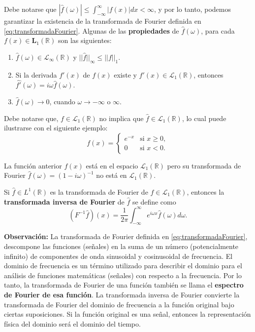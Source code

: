 \begin{multicols}{2}
Debe notarse que $|\hat{f}(\omega)| \leq \int_{-\infty}^{\infty} |f(x)| dx < \infty$, y por lo tanto, podemos garantizar la existencia de la transformada de Fourier definida en \ref{eq:transformadaFourier}. Algunas de las \textbf{propiedades} de $\hat{f}(\omega)$, para cada $f(x) \in \textbf{L}_1(\mathbb{R})$ son las siguientes:
\begin{enumerate}[(1)]
    \item  $\hat{f}(\omega) \in \mathcal{L}_\infty(\mathbb{R})$ y $||\hat{f}||_\infty \leq ||f||_1$.
    \item  Si la derivada $f'(x)$ de $f(x)$ existe y $f'(x) \in \mathcal{L}_1(\mathbb{R})$, entonces $\hat{f'}(\omega) = i\omega \hat{f}(\omega)$.
    \item $\hat{f}(\omega) \rightarrow 0$, cuando $\omega \rightarrow -\infty$ o $\infty$.
\end{enumerate}

Debe notarse que, $f \in \mathcal{L}_1(\mathbb{R})$ no implica que $\hat{f} \in \mathcal{L}_1(\mathbb{R})$, lo cual puede ilustrarse con el siguiente ejemplo:
$$
f(x) = 
\begin{cases} 
e^{-x} & \text{si } x \geq 0, \\
0 & \text{si } x < 0.
\end{cases}
$$

La función anterior $f(x)$ está en el espacio $\mathcal{L}_1(\mathbb{R})$ pero su transformada de Fourier $\hat{f}(\omega) = (1 - i\omega)^{-1}$ no está en $\mathcal{L}_1(\mathbb{R})$.

Si $\hat{f} \in L^1(\mathbb{R})$ es la transformada de Fourier de $f \in \mathcal{L}_1(\mathbb{R})$, entonces la \textbf{transformada inversa de Fourier} de $\hat{f}$ se define como
\begin{equation}
(F^{-1}\hat{f})(x) = \frac{1}{2\pi} \int_{-\infty}^{\infty} e^{i\omega x} \hat{f}(\omega) d\omega.
\label{eq:transformadaInversaFourier}
\end{equation}

\textbf{Observación:}\;  La transformada de Fourier definida en \ref{eq:transformadaFourier}, descompone las funciones (señales) en la suma de un número (potencialmente infinito) de componentes de onda sinusoidal y cosinusoidal de frecuencia. El dominio de frecuencia es un término utilizado para describir el dominio para el análisis de funciones matemáticas (señales) con respecto a la frecuencia. Por lo tanto, la transformada de Fourier de una función también se llama el \textbf{espectro de Fourier de esa función}. La transformada inversa de Fourier convierte la transformada de Fourier del dominio de frecuencia a la función original bajo ciertas suposiciones. Si la función original es una señal, entonces la representación física del dominio será el dominio del tiempo.


\end{multicols}
